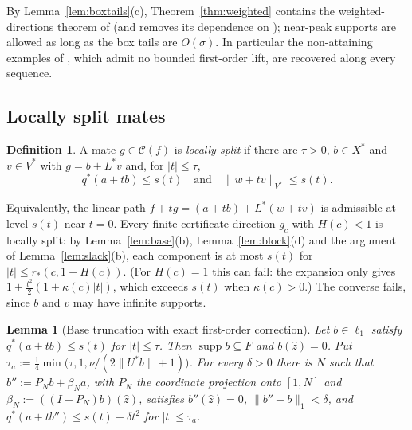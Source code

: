\documentclass[10pt]{amsart}
\newtheorem{lemma}[theorem]{Lemma}
\theoremstyle{definition}
\newtheorem{definition}[theorem]{Definition}
\theoremstyle{remark}
\newcommand{\supp}{\operatorname{supp}}
\newcommand{\Cset}{\mathcal C}
\newcommand{\zh}{\hat z}
\begin{document}
By Lemma~\ref{lem:boxtails}(c), Theorem~\ref{thm:weighted} contains
the weighted-directions theorem of \cite{PrA} (and removes its dependence on \cite{Check});
near-peak supports are allowed as long as the box tails are $O(\sigma)$.
In particular the non-attaining examples of \cite[Section~3]{PrA}, which
admit no bounded first-order lift, are recovered along every sequence.

\subsection{Locally split mates}

\begin{definition}\label{def:locsplit}
A mate $g\in\Cset(f)$ is \emph{locally split} if there are $\tau>0$,
$b\in X^*$ and $v\in V^*$ with $g=b+L^*v$ and, for $|t|\le\tau$,
\[
 q^*(a+tb)\le s(t)\quad\text{and}\quad\|w+tv\|_{V^*}\le s(t).
\]
\end{definition}

Equivalently, the linear path $f+tg=(a+tb)+L^*(w+tv)$ is admissible at
level $s(t)$ near $t=0$.  Every finite certificate direction $g_c$ with
$H(c)<1$ is locally split: by Lemma~\ref{lem:base}(b),
Lemma~\ref{lem:block}(d) and the argument of Lemma~\ref{lem:slack}(b),
each component is at most $s(t)$ for $|t|\le r_*(c,1-H(c))$.  (For
$H(c)=1$ this can fail: the expansion only gives
$1+\frac{t^2}2(1+\kappa(c)|t|)$, which exceeds $s(t)$ when $\kappa(c)>0$.)
The converse fails, since $b$ and $v$ may have infinite supports.

\begin{lemma}[Base truncation with exact first-order correction]\label{lem:basetrunc}
Let $b\in\ell_1$ satisfy $q^*(a+tb)\le s(t)$ for $|t|\le\tau$.  Then
$\supp b\subseteq F$ and $b(\zh)=0$.  Put
$\tau_a:=\frac14\min\big(\tau,1,\nu/(2\|U^*b\|+1)\big)$.  For every
$\delta>0$ there is $N$ such that $b'':=P_Nb+\beta_Na$, with $P_N$ the
coordinate projection onto $[1,N]$ and $\beta_N:=((I-P_N)b)(\zh)$,
satisfies $b''(\zh)=0$, $\|b''-b\|_1<\delta$, and
$q^*(a+tb'')\le s(t)+\delta t^2$ for $|t|\le\tau_a$.
\end{lemma}
\end{document}
